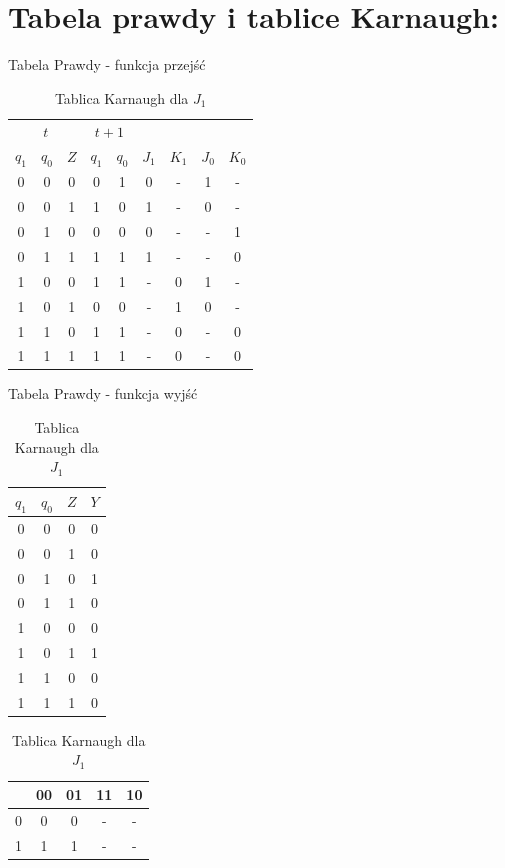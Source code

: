 \documentclass[12pt,a4paper]{article}
\begin{document}
		\section{Tabela prawdy i tablice Karnaugh:}
			\begin{table}[H]
			\begin{minipage}{.5\textwidth}
				\caption{Tabela Prawdy - funkcja przejść}
				\vspace{0.2cm}
				\centering
				\begin{tabular}{ccc|cc|cccc}
					\multicolumn{3}{c|}{\(t\)}	&	\multicolumn{2}{c|}{\(t+1\)} &&&\\
					\(q_1\)	&	\(q_0\)	&	\(Z\)	&	\(q_1\)	&	\(q_0\)	&	\(J_1\)	&	\(K_1\)	&	\(J_0\)	&	\(K_0\)	\\\hline
					0	&	0	&	0	&	0	&	1	&	0	&	-	&	1	&	-	\\
					0	&	0	&	1	&	1	&	0	&	1	&	-	&	0	&	-	\\
					0	&	1	&	0	&	0	&	0	&	0	&	-	&	-	&	1	\\
					0	&	1	&	1	&	1	&	1	&	1	&	-	&	-	&	0	\\\hline
					1	&	0	&	0	&	1	&	1	&	-	&	0	&	1	&	-	\\
					1	&	0	&	1	&	0	&	0	&	-	&	1	&	0	&	-	\\
					1	&	1	&	0	&	1	&	1	&	-	&	0	&	-	&	0	\\
					1	&	1	&	1	&	1	&	1	&	-	&	0	&	-	&	0	\\
				\end{tabular}
				\vspace{2cm}
			
				\caption{Tabela Prawdy - funkcja wyjść}
				\vspace{0.2cm}
				\centering
				\begin{tabular}{ccc|c}
					\(q_1\)	&	\(q_0\)	&	\(Z\)	&	\(Y\)	\\\hline
					0	&	0	&	0	&	0	\\
					0	&	0	&	1	&	0	\\
					0	&	1	&	0	&	1	\\
					0	&	1	&	1	&	0	\\\hline
					1	&	0	&	0	&	0	\\
					1	&	0	&	1	&	1	\\
					1	&	1	&	0	&	0	\\
					1	&	1	&	1	&	0	\\
				\end{tabular}
			\end{minipage}%
			\begin{minipage}{.5\textwidth}
				\caption{Tablica Karnaugh dla $J_1$}
				\vspace{0.2cm}
				\centering
				\begin{tabular}{c|c|c|c|c}
					\backslashbox{$Z$}{$q_1q_0$}	&	00	&	01	&	11	&	10	\\\hline
					0	&	0	&	0	&	-	&	-	\\\hline
					1	&	1	&	1	&	-	&	-	
				\end{tabular}
				

\end{minipage}
\end{table}
\end{document}
